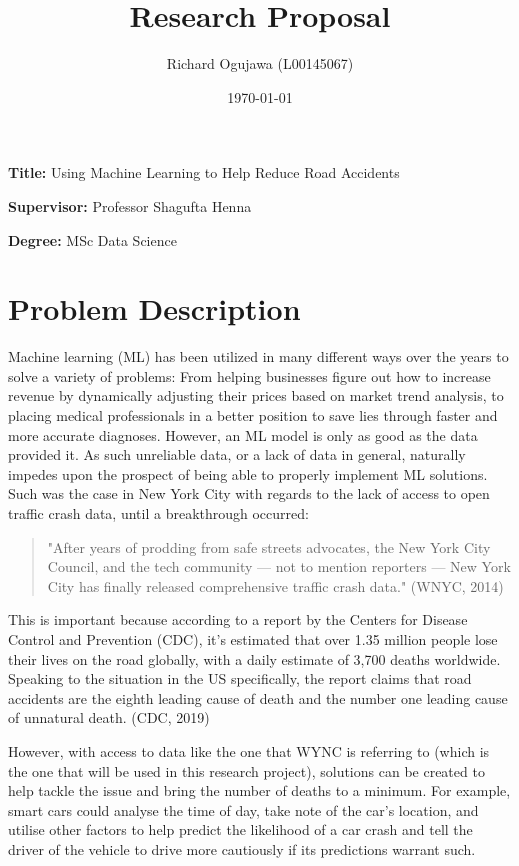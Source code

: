 \documentclass[12pt, a4paper]{article}
\title{\textbf{Research Proposal}}
\author{Richard Ogujawa (L00145067)}
\date{\today}
\newcommand{\namelistlabel}[1]{\mbox{#1}\hfil}
\newenvironment{namelist}[1]{%
\begin{list}{}
    {
        \let\makelabel\namelistlabel
        \settowidth{\labelwidth}{#1}
        \setlength{\leftmargin}{1.1\labelwidth}
    }
  }{%
\end{list}}
\begin{document}
\maketitle

\begin{namelist}{xxxxxxxxxxxx}
\item[{\bf Title:}]
	Using Machine Learning to Help Reduce Road Accidents
\item[{\bf Supervisor:}]
	Professor Shagufta Henna 
\item[{\bf Degree:}]
	MSc Data Science
\end{namelist}

\section*{Problem Description}Machine learning (ML) has been utilized in many different ways over the years to solve a variety of problems: From helping businesses figure out how to increase revenue by dynamically adjusting their prices based on market trend analysis, to placing medical professionals in a better position to save lies through faster and more accurate diagnoses. However, an ML model is only as good as the data provided it. As such unreliable data, or a lack of data in general, naturally impedes upon the prospect of being able to properly implement ML solutions. \\
Such was the case in New York City with regards to the lack of access to open traffic crash data, until a breakthrough occurred:
\begin{quote}
    "After years of prodding from safe streets advocates, the New York City Council, and the tech community — not to mention reporters — New York City has finally released comprehensive traffic crash data." (WNYC, 2014)
\end{quote}

This is important because according to a report by the Centers for Disease Control and Prevention (CDC), it's estimated that over 1.35 million people lose their lives on the road globally, with a daily estimate of 3,700 deaths worldwide. Speaking to the situation in the US specifically, the report claims that road accidents are the eighth leading cause of death and the number one leading cause of unnatural death. (CDC, 2019)

However, with access to data like the one that WYNC is referring to (which is the one that will be used  in this research project), solutions can be created to help tackle the issue and bring the number of deaths to a minimum. For example, smart cars could analyse the time of day, take note of the car's location, and utilise other factors to help predict the likelihood of a car crash and tell the driver of the vehicle to drive more cautiously if its predictions warrant such.
\end{document}
